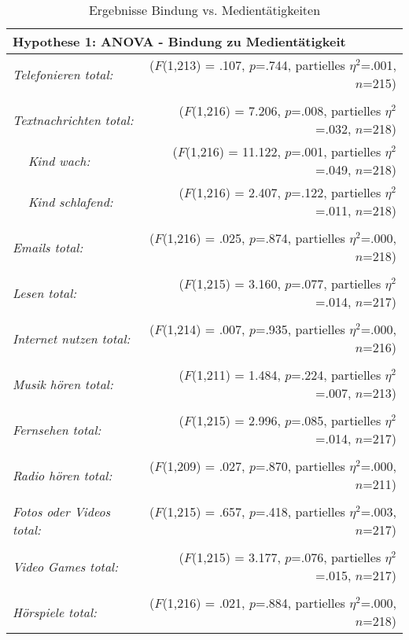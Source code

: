 \begin{table}[ht]
\centering
\captionsetup{margin=20pt,skip=5pt}
\caption{Ergebnisse Bindung vs. Medientätigkeiten}
\label{table:AppResultateMedientaetigkeiten}
\begin{tabular}{l l  r }
  \multicolumn{3}{l}{\textbf{Hypothese 1:} ANOVA - Bindung zu Medientätigkeit}\\
  \hline
  \multicolumn{2}{l}{\textit{Telefonieren total:}} & ($F$(1,213) = .107, $p$=.744, partielles $\eta^2$=.001, $n$=215)\\
  &&\\
  \multicolumn{2}{l}{\textit{Textnachrichten total:}} & ($F$(1,216) = 7.206, $p$=.008, partielles $\eta^2$=.032, $n$=218)\\
  & \textit{Kind wach:} & ($F$(1,216) = 11.122, $p$=.001, partielles $\eta^2$=.049, $n$=218)\\
  & \textit{Kind schlafend:} & ($F$(1,216) = 2.407, $p$=.122, partielles $\eta^2$=.011, $n$=218)\\
  &&\\
  \multicolumn{2}{l}{\textit{Emails total:}} & ($F$(1,216) = .025, $p$=.874, partielles $\eta^2$=.000, $n$=218)\\
  &&\\
  \multicolumn{2}{l}{\textit{Lesen total:}} & ($F$(1,215) = 3.160, $p$=.077, partielles $\eta^2$=.014, $n$=217)\\
  &&\\
  \multicolumn{2}{l}{\textit{Internet nutzen total:}} & ($F$(1,214) = .007, $p$=.935, partielles $\eta^2$=.000, $n$=216)\\
  &&\\
  \multicolumn{2}{l}{\textit{Musik hören total:}} & ($F$(1,211) = 1.484, $p$=.224, partielles $\eta^2$=.007, $n$=213)\\
  &&\\
  \multicolumn{2}{l}{\textit{Fernsehen total: }} & ($F$(1,215) = 2.996, $p$=.085, partielles $\eta^2$=.014, $n$=217)\\
  &&\\
  \multicolumn{2}{l}{\textit{Radio hören total:}} & ($F$(1,209) = .027, $p$=.870, partielles $\eta^2$=.000, $n$=211)\\
  &&\\
  \multicolumn{2}{l}{\textit{Fotos oder Videos total: }} & ($F$(1,215) = .657, $p$=.418, partielles $\eta^2$=.003, $n$=217)\\
  &&\\
  \multicolumn{2}{l}{\textit{Video Games total:}} & ($F$(1,215) = 3.177, $p$=.076, partielles $\eta^2$=.015, $n$=217)\\
  &&\\
  \multicolumn{2}{l}{\textit{Hörspiele total:}} & ($F$(1,216) = .021, $p$=.884, partielles $\eta^2$=.000, $n$=218)\\
\end{tabular}
\end{table}